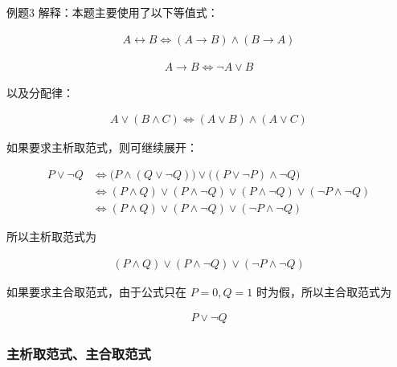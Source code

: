 \begin{question}{例题3}
	解释：本题主要使用了以下等值式：
	
	\begin{align*}
		A\leftrightarrow B \Leftrightarrow (A\to B)\land(B\to A)
	\end{align*}
	
	\begin{align*}
		A\to B \Leftrightarrow \neg A\lor B
	\end{align*}
	
	以及分配律：
	
	\begin{align*}
		A\lor(B\land C)\Leftrightarrow (A\lor B)\land(A\lor C)
	\end{align*}
	
	如果要求主析取范式，则可继续展开：
	
	\begin{align*}
		P\lor \neg Q
		&\Leftrightarrow \big(P\land(Q\lor \neg Q)\big)\lor \big((P\lor \neg P)\land \neg Q\big) \\
		&\Leftrightarrow (P\land Q)\lor(P\land \neg Q)\lor(P\land \neg Q)\lor(\neg P\land \neg Q) \\
		&\Leftrightarrow (P\land Q)\lor(P\land \neg Q)\lor(\neg P\land \neg Q)
	\end{align*}
	
	所以主析取范式为
	
	\begin{align*}
		\boxed{(P\land Q)\lor(P\land \neg Q)\lor(\neg P\land \neg Q)}
	\end{align*}
	
	如果要求主合取范式，由于公式只在 \(P=0,Q=1\) 时为假，所以主合取范式为
	
	\begin{align*}
		\boxed{P\lor \neg Q}
	\end{align*}
	
\end{question}

\subsubsection{主析取范式、主合取范式}

